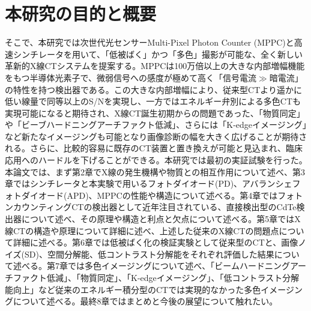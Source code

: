 \section{本研究の目的と概要}
そこで、本研究では次世代光センサーMulti-Pixel Photon Counter (MPPC)と高速シンチレータを用いて、「低被ばく」かつ「多色」撮影が可能な、全く新しい革新的X線CTシステムを提案する。MPPCは100万倍以上の大きな内部増幅機能をもつ半導体光素子で、微弱信号への感度が極めて高く「信号電流$\gg$暗電流」の特性を持つ検出器である。この大きな内部増幅により、従来型CTより遥かに低い線量で同等以上のS/Nを実現し、一方ではエネルギー弁別による多色CTも実現可能になると期待され、X線CT誕生初期からの問題であった、「物質同定」や「ビーブハードニングアーチファクト低減」、さらには「K-edgeイメージング」など新たなイメージングも可能となり画像診断の幅を大きく広げることが期待される。さらに、比較的容易に既存のCT装置と置き換えが可能と見込まれ、臨床応用へのハードルを下げることができる。本研究では最初の実証試験を行った。
本論文では、まず第2章でX線の発生機構や物質との相互作用について述べ、第3章ではシンチレータと本実験で用いるフォトダイオード(PD)、アバランシェフォトダイオード(APD)、MPPCの性能や構造について述べる。第4章ではフォトンカウンティングCTの検出器として近年注目されている、直接検出型のCdTe検出器について述べ、その原理や構造と利点と欠点について述べる。第5章ではX線CTの構造や原理について詳細に述べ、上述した従来のX線CTの問題点について詳細に述べる。第6章では低被ばく化の検証実験として従来型のCTと、画像ノイズ(SD)、空間分解能、低コントラスト分解能をそれぞれ評価した結果について述べる。第7章では多色イメージングについて述べ、「ビームハードニングアーチファクト低減」、「物質同定」、「K-edgeイメージング」、「低コントラスト分解能向上」など従来のエネルギー積分型のCTでは実現的なかった多色イメージングについて述べる。最終8章ではまとめと今後の展望について触れたい。






